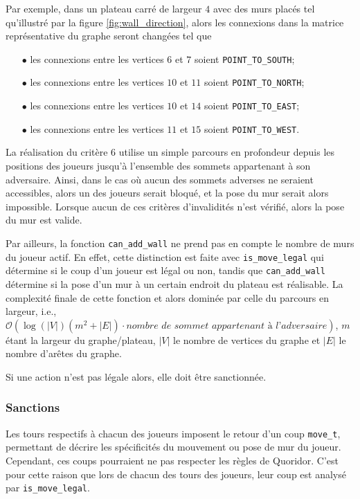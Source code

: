 \documentclass[11pt]{article}
\begin{document}
Par exemple, dans un plateau carré de largeur $4$ avec des murs placés tel qu'illustré par la figure \ref{fig:wall_direction}, alors les connexions dans la matrice représentative du graphe seront changées tel que
\begin{itemize}
    \item [$\bullet$] les connexions entre les vertices $6$ et $7$ soient \texttt{POINT\_TO\_SOUTH};
    \item [$\bullet$] les connexions entre les vertices $10$ et $11$ soient \texttt{POINT\_TO\_NORTH};
    \item [$\bullet$] les connexions entre les vertices $10$ et $14$ soient \texttt{POINT\_TO\_EAST};
    \item [$\bullet$] les connexions entre les vertices $11$ et $15$ soient \texttt{POINT\_TO\_WEST}.
\end{itemize}

La réalisation du critère $6$ utilise un simple parcours en profondeur depuis les positions des joueurs jusqu'à l'ensemble des sommets appartenant à son adversaire. Ainsi, dans le cas où aucun des sommets adverses ne seraient accessibles, alors un des joueurs serait bloqué, et la pose du mur serait alors impossible. Lorsque aucun de ces critères d'invalidités n'est vérifié, alors la pose du mur est valide.

Par ailleurs, la fonction \texttt{can\_add\_wall} ne prend pas en compte le nombre de murs du joueur actif. En effet, cette distinction est faite avec \texttt{is\_move\_legal} qui détermine si le coup d'un joueur est légal ou non, tandis que \texttt{can\_add\_wall} détermine si la pose d'un mur à un certain endroit du plateau est réalisable. La complexité finale de cette fonction et alors dominée par celle du parcours en largeur, i.e., $\mathcal{O}(\log(|V|)(m^{2}+|E|)\cdot\textit{nombre de sommet appartenant à l'adversaire})$, $m$ étant la largeur du graphe/plateau, $|V|$ le nombre de vertices du graphe et $|E|$ le nombre d'arêtes du graphe.

Si une action n'est pas légale alors, elle doit être sanctionnée.

\subsubsection{Sanctions}

Les tours respectifs à chacun des joueurs imposent le retour d'un coup \texttt{move\_t}, permettant de décrire les spécificités du mouvement ou pose de mur du joueur. Cependant, ces coups pourraient ne pas respecter les règles de Quoridor. C'est pour cette raison que lors de chacun des tours des joueurs, leur coup est analysé par \texttt{is\_move\_legal}. 
\end{document}
